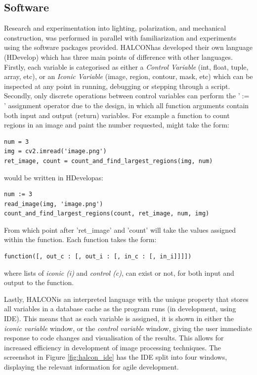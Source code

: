 \documentclass[fleqn,twoside,12pt]{report}
\begin{document}
\subsection{Software}
\label{sec:software}

Research and experimentation into lighting, polarization, and mechanical construction, was performed in parallel with familiarization and experiments using the software packages provided. HALCON\texttrademark has developed their own language (HDevelop\texttrademark) which has three main points of difference with other languages. Firstly, each variable is categorised as either a \textit{Control Variable} (int, float, tuple, array, etc), or an \textit{Iconic Variable} (image, region, contour, mask, etc) which can be inspected at any point in running, debugging or stepping through a script. Secondly, only discrete operations between control variables can perform the '$:=$' assignment operator due to the design, in which all function arguments contain both input and output (return) variables. For example a function to count regions in an image and paint the number requested, might take the form:

\begin{lstlisting}
num = 3
img = cv2.imread('image.png')
ret_image, count = count_and_find_largest_regions(img, num)
\end{lstlisting} 

would be written in HDevelop\texttrademark as:

\begin{lstlisting}
num := 3
read_image(img, 'image.png')
count_and_find_largest_regions(count, ret_image, num, img)
\end{lstlisting} 

From which point after 'ret\_image' and 'count' will take the values assigned within the function. Each function takes the form:

\begin{lstlisting}
function([, out_c : [, out_i : [, in_c : [, in_i]]]])
\end{lstlisting} 

where lists of  \textit{iconic (i)} and  \textit{control (c)}, can exist or not, for both input and output to the function.


Lastly, HALCON\texttrademark is an interpreted language with the unique property that stores all variables in a database cache as the program runs (in development, using IDE). This means that as each variable is assigned, it is shown in either the \textit{iconic variable} window, or the \textit{control variable} window, giving the user immediate response to code changes and visualisation of the results. This allows for increased efficiency in development of image processing techniques. The screenshot in Figure \ref{fig:halcon_ide} has the IDE split into four windows, displaying the relevant information for agile development.  
\end{document}
